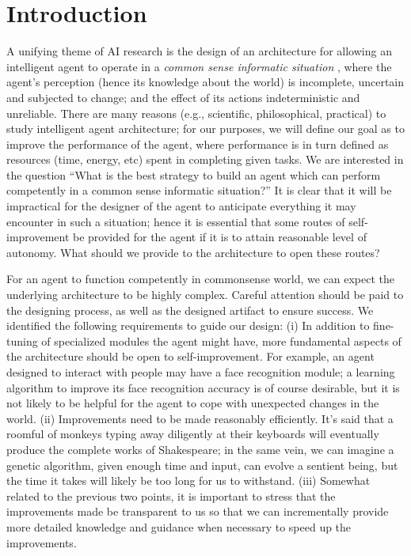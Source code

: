 \documentclass{llncs}
\begin{document}
\section{Introduction}

A unifying theme of AI research is the design of an architecture for
allowing an intelligent agent to operate in a \emph{common sense informatic
  situation} \cite{mccarthy1989:artificial_intelligence}, where the agent's
perception (hence its knowledge about the world) is incomplete, uncertain
and subjected to change; and the effect of its actions indeterministic and
unreliable.  There are many reasons (e.g., scientific, philosophical,
practical) to study intelligent agent architecture; for our purposes, we
will define our goal as to improve the performance of the agent, where
performance is in turn defined as resources (time, energy, etc) spent in
completing given tasks.  We are interested in the question {}``What is the
best strategy to build an agent which can perform competently in a common
sense informatic situation?''  It is clear that it will be impractical for
the designer of the agent to anticipate everything it may encounter in such
a situation; hence it is essential that some routes of self-improvement be
provided for the agent if it is to attain reasonable level of autonomy.
What should we provide to the architecture to open these routes?

For an agent to function competently in commonsense world, we can expect
the underlying architecture to be highly complex.  Careful attention should
be paid to the designing process, as well as the designed artifact to
ensure success.  We identified the following requirements to guide our
design: (i) In addition to fine-tuning of specialized modules the agent
might have, more fundamental aspects of the architecture should be open to
self-improvement.  For example, an agent designed to interact with people
may have a face recognition module; a learning algorithm to improve its
face recognition accuracy is of course desirable, but it is not likely to
be helpful for the agent to cope with unexpected changes in the world.
(ii) Improvements need to be made reasonably efficiently.  It's said that a
roomful of monkeys typing away diligently at their keyboards will
eventually produce the complete works of Shakespeare; in the same vein, we
can imagine a genetic algorithm, given enough time and input, can evolve a
sentient being, but the time it takes will likely be too long for us to
withstand.  (iii) Somewhat related to the previous two points, it is
important to stress that the improvements made be transparent to us so that
we can incrementally provide more detailed knowledge and guidance when
necessary to speed up the improvements.
\end{document}
